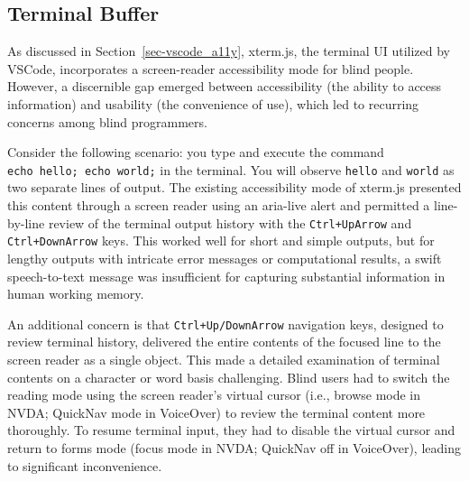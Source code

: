 \documentclass[sigconf]{acmart}
\begin{document}
\hypertarget{terminal-buffer}{%
\subsection{Terminal Buffer}\label{terminal-buffer}}

As discussed in Section~\ref{sec-vscode_a11y}, xterm.js, the terminal UI
utilized by VSCode, incorporates a screen-reader accessibility mode for
blind people. However, a discernible gap emerged between accessibility
(the ability to access information) and usability (the convenience of
use), which led to recurring concerns among blind programmers.

Consider the following scenario: you type and execute the command
\texttt{echo\ hello;\ echo\ world;} in the terminal. You will observe
\texttt{hello} and \texttt{world} as two separate lines of output. The
existing accessibility mode of xterm.js presented this content through a
screen reader using an aria-live alert and permitted a line-by-line
review of the terminal output history with the \texttt{Ctrl+UpArrow} and
\texttt{Ctrl+DownArrow} keys. This worked well for short and simple
outputs, but for lengthy outputs with intricate error messages or
computational results, a swift speech-to-text message was insufficient
for capturing substantial information in human working memory.

An additional concern is that \texttt{Ctrl+Up/DownArrow} navigation
keys, designed to review terminal history, delivered the entire contents
of the focused line to the screen reader as a single object. This made a
detailed examination of terminal contents on a character or word basis
challenging. Blind users had to switch the reading mode using the screen
reader's virtual cursor (i.e., browse mode in NVDA; QuickNav mode in
VoiceOver) to review the terminal content more thoroughly. To resume
terminal input, they had to disable the virtual cursor and return to
forms mode (focus mode in NVDA; QuickNav off in VoiceOver), leading to
significant inconvenience.
\end{document}
